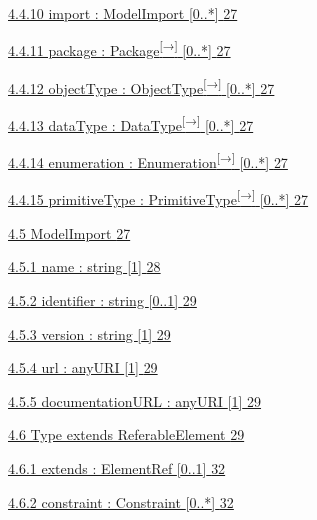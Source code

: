 \documentclass[10pt,a4paper]{ivoa}
\begin{document}
\protect\hyperlink{import-modelimport-0..}{4.4.10 import : ModelImport
{[}0..*{]} \protect\hyperlink{import-modelimport-0..}{27}}

\protect\hyperlink{package-package-0..-1}{4.4.11 package :
Package\textsuperscript{{[}→{]}} {[}0..*{]}
\protect\hyperlink{package-package-0..-1}{27}}

\protect\hyperlink{objecttype-objecttype-0..-1}{4.4.12 objectType :
ObjectType\textsuperscript{{[}→{]}} {[}0..*{]}
\protect\hyperlink{objecttype-objecttype-0..-1}{27}}

\protect\hyperlink{datatype-datatype-0..-1}{4.4.13 dataType :
DataType\textsuperscript{{[}→{]}} {[}0..*{]}
\protect\hyperlink{datatype-datatype-0..-1}{27}}

\protect\hyperlink{enumeration-enumeration-0..-1}{4.4.14 enumeration :
Enumeration\textsuperscript{{[}→{]}} {[}0..*{]}
\protect\hyperlink{enumeration-enumeration-0..-1}{27}}

\protect\hyperlink{primitivetype-primitivetype-0..-1}{4.4.15
primitiveType : PrimitiveType\textsuperscript{{[}→{]}} {[}0..*{]}
\protect\hyperlink{primitivetype-primitivetype-0..-1}{27}}

\protect\hyperlink{modelimport}{4.5 ModelImport
\protect\hyperlink{modelimport}{27}}

\protect\hyperlink{name-string-1-1}{4.5.1 name : string {[}1{]}
\protect\hyperlink{name-string-1-1}{28}}

\protect\hyperlink{identifier-string-0..1}{4.5.2 identifier : string
{[}0..1{]} \protect\hyperlink{identifier-string-0..1}{29}}

\protect\hyperlink{version-string-1-1}{4.5.3 version : string {[}1{]}
\protect\hyperlink{version-string-1-1}{29}}

\protect\hyperlink{url-anyuri-1}{4.5.4 url : anyURI {[}1{]}
\protect\hyperlink{url-anyuri-1}{29}}

\protect\hyperlink{documentationurl-anyuri-1}{4.5.5 documentationURL :
anyURI {[}1{]} \protect\hyperlink{documentationurl-anyuri-1}{29}}

\protect\hyperlink{type-extends-referableelement}{4.6 Type extends
ReferableElement \protect\hyperlink{type-extends-referableelement}{29}}

\protect\hyperlink{extends-elementref-0..1}{4.6.1 extends : ElementRef
{[}0..1{]} \protect\hyperlink{extends-elementref-0..1}{32}}

\protect\hyperlink{constraint-constraint-0..}{4.6.2 constraint :
Constraint {[}0..*{]} \protect\hyperlink{constraint-constraint-0..}{32}}
\end{document}
